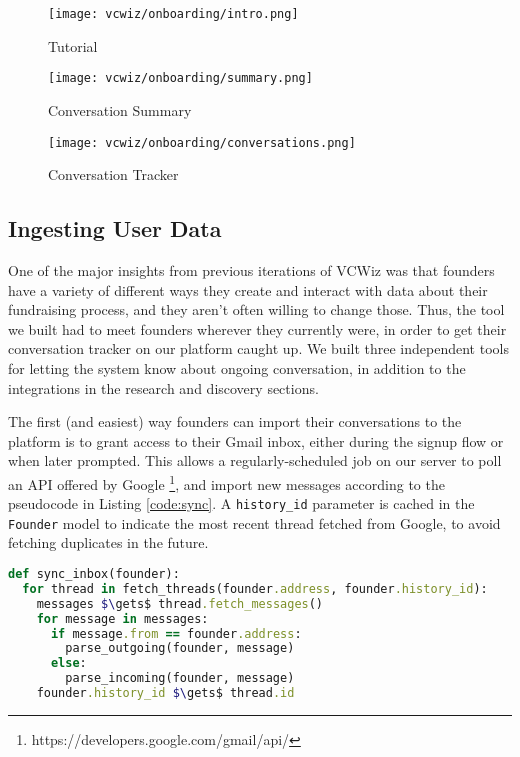 \begin{figure}[ht]
  \centering
  \begin{minipage}{0.33\textwidth}
    \centering
    \texttt{[image: vcwiz/onboarding/intro.png]}
    \caption*{Tutorial}
  \end{minipage}\hfill
  \begin{minipage}{0.33\textwidth}
    \centering
    \texttt{[image: vcwiz/onboarding/summary.png]}
    \caption*{Conversation Summary}
  \end{minipage}\hfill
  \begin{minipage}{0.33\textwidth}
    \centering
    \texttt{[image: vcwiz/onboarding/conversations.png]}
    \caption*{Conversation Tracker}
  \end{minipage}
\end{figure}

\subsection{Ingesting User Data}
\label{vcwiz:ingesting}

One of the major insights from previous iterations of VCWiz was that founders have a variety of different ways they create and interact with data about their fundraising process, and they aren't often willing to change those. Thus, the tool we built had to meet founders wherever they currently were, in order to get their conversation tracker on our platform caught up. We built three independent tools for letting the system know about ongoing conversation, in addition to the integrations in the research and discovery sections.

The first (and easiest) way founders can import their conversations to the platform is to grant access to their Gmail inbox, either during the signup flow or when later prompted. This allows a regularly-scheduled job on our server to poll an API offered by Google \footnote{https://developers.google.com/gmail/api/}, and import new messages according to the pseudocode in Listing \ref{code:sync}. A \texttt{history\_id} parameter is cached in the \texttt{Founder} model to indicate the most recent thread fetched from Google, to avoid fetching duplicates in the future.

\begin{lstlisting}[float,frame=single,mathescape=true,language=Ruby,basicstyle=\footnotesize,columns=fullflexible,caption={Sync Inbox},label={code:sync}]
def sync_inbox(founder):
  for thread in fetch_threads(founder.address, founder.history_id):
    messages $\gets$ thread.fetch_messages()
    for message in messages:
      if message.from == founder.address:
        parse_outgoing(founder, message)
      else:
        parse_incoming(founder, message)
    founder.history_id $\gets$ thread.id
\end{lstlisting}

